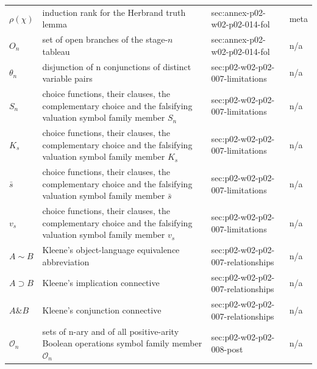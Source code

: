 \begin{longtable}{@{}p{}p{}p{}p{}@{}}
\(\rho(\chi)\) & induction rank for the Herbrand truth lemma & sec:\allowbreak{}annex-\allowbreak{}p02-\allowbreak{}w02-\allowbreak{}p02-\allowbreak{}014-\allowbreak{}fol & meta \\
\(O_n\) & set of open branches of the stage-\(n\) tableau & sec:\allowbreak{}annex-\allowbreak{}p02-\allowbreak{}w02-\allowbreak{}p02-\allowbreak{}014-\allowbreak{}fol & n/a \\
\(\theta_n\) & disjunction of n conjunctions of distinct variable pairs & sec:\allowbreak{}p02-\allowbreak{}w02-\allowbreak{}p02-\allowbreak{}007-\allowbreak{}limitations & n/a \\
\(S_n\) & choice functions, their clauses, the complementary choice and the falsifying valuation symbol family member \(S_n\) & sec:\allowbreak{}p02-\allowbreak{}w02-\allowbreak{}p02-\allowbreak{}007-\allowbreak{}limitations & n/a \\
\(K_s\) & choice functions, their clauses, the complementary choice and the falsifying valuation symbol family member \(K_s\) & sec:\allowbreak{}p02-\allowbreak{}w02-\allowbreak{}p02-\allowbreak{}007-\allowbreak{}limitations & n/a \\
\(\bar s\) & choice functions, their clauses, the complementary choice and the falsifying valuation symbol family member \(\bar s\) & sec:\allowbreak{}p02-\allowbreak{}w02-\allowbreak{}p02-\allowbreak{}007-\allowbreak{}limitations & n/a \\
\(v_s\) & choice functions, their clauses, the complementary choice and the falsifying valuation symbol family member \(v_s\) & sec:\allowbreak{}p02-\allowbreak{}w02-\allowbreak{}p02-\allowbreak{}007-\allowbreak{}limitations & n/a \\
\(A\sim B\) & Kleene's object-language equivalence abbreviation & sec:\allowbreak{}p02-\allowbreak{}w02-\allowbreak{}p02-\allowbreak{}007-\allowbreak{}relationships & n/a \\
\(A\supset B\) & Kleene's implication connective & sec:\allowbreak{}p02-\allowbreak{}w02-\allowbreak{}p02-\allowbreak{}007-\allowbreak{}relationships & n/a \\
\(A\mathbin{\&}B\) & Kleene's conjunction connective & sec:\allowbreak{}p02-\allowbreak{}w02-\allowbreak{}p02-\allowbreak{}007-\allowbreak{}relationships & n/a \\
\(\mathcal O_n\) & sets of n-ary and of all positive-arity Boolean operations symbol family member \(\mathcal O_n\) & sec:\allowbreak{}p02-\allowbreak{}w02-\allowbreak{}p02-\allowbreak{}008-\allowbreak{}post & n/a \\

\end{longtable}
